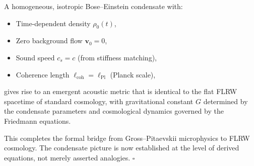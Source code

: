 \begin{proposition}
\label{prop:correspondence}
A homogeneous, isotropic Bose--Einstein condensate with:
\begin{itemize}
    \item Time-dependent density $\rho_0(t)$,
    \item Zero background flow $\mathbf{v}_0 = 0$,
    \item Sound speed $c_s = c$ (from stiffness matching),
    \item Coherence length $\ell_{\mathrm{coh}} = \ell_{\mathrm{Pl}}$ (Planck scale),
\end{itemize}
gives rise to an emergent acoustic metric that is identical to the flat FLRW spacetime of standard cosmology, with gravitational constant $G$ determined by the condensate parameters and cosmological dynamics governed by the Friedmann equations.
\end{proposition}

This completes the formal bridge from Gross--Pitaevskii microphysics to FLRW cosmology. The condensate picture is now established at the level of derived equations, not merely asserted analogies. \hfill $\square$

